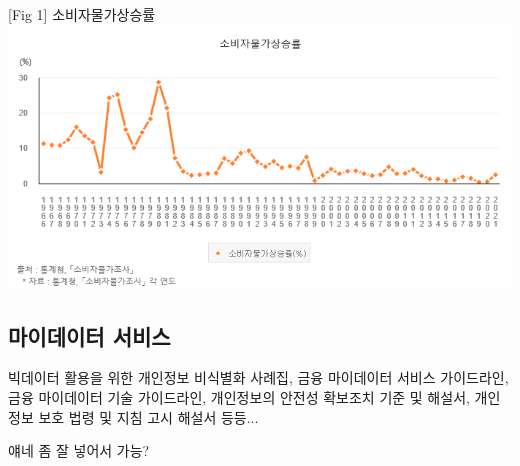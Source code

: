 \documentclass[preprint]{revtex4-2}
\begin{document}
[Fig 1] 소비자물가상승률\\
\includegraphics[width=\textwidth]{images/price.png} \\

\subsection{마이데이터 서비스}

빅데이터 활용을 위한 개인정보 비식별화 사례집, 금융 마이데이터 서비스 가이드라인, 금융 마이데이터 기술 가이드라인, 개인정보의 안전성 확보조치 기준 및 해설서, 개인정보 보호 법령 및 지침 고시 해설서 등등...

얘네 좀 잘 넣어서 가능?
\end{document}
